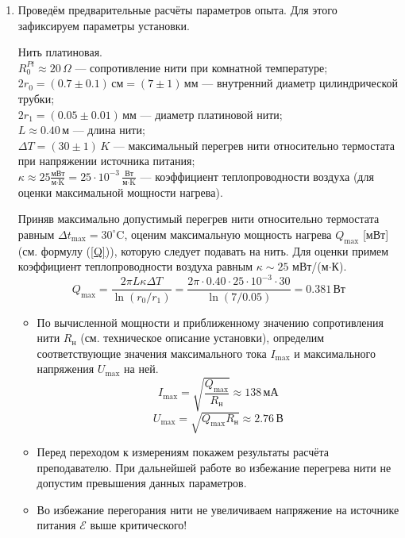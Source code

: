 \documentclass[a4paper,12pt]{article} %
\begin{document}
\begin{enumerate}
    \item Проведём предварительные расчёты параметров опыта. Для этого зафиксируем параметры установки. 
    
    Нить платиновая. \\
    $R^{Pt}_0 \approx 20 \, \Omega$ — сопротивление нити при комнатной температуре; \\
    $2r_0 = (0.7 \pm 0.1) \, \text{см} = (7 \pm 1) \, \text{мм}$ — внутренний диаметр цилиндрической трубки; \\
    $2r_1 = (0.05 \pm 0.01) \, \text{мм}$ — диаметр платиновой нити; \\
    $L \approx 0.40 \, \text{м}$ — длина нити; \\
    $\Delta T = (30 \pm 1) \, K$ — максимальный перегрев нити относительно термостата при напряжении источника питания; \\
    $\kappa \approx 25 \frac{\text{мВт}}{\text{м}\cdot\text{K}} = 25 \cdot 10^{-3} \, \frac{\text{Вт}}{\text{м}\cdot\text{K}}$ — коэффициент теплопроводности воздуха (для оценки максимальной мощности нагрева). 
    
    Приняв максимально допустимый перегрев нити относительно термостата равным $\Delta t_{\text{max}} = 30^\circ$C, оценим максимальную мощность нагрева $Q_{\text{max}}$ [мВт] (см. формулу (\ref{Q})), которую следует подавать на нить. Для оценки примем коэффициент теплопроводности воздуха равным $\kappa \sim 25$ мВт/(м$\cdot$К).
    \[
      Q_{\text{max}} = \frac{2\pi L \kappa \Delta T}{\ln(r_0 / r_1)} = \frac{2 \pi \cdot 0.40 \cdot 25 \cdot 10^{-3} \cdot 30}{\ln(7/0.05)} = 0.381 \, \text{Вт}
    \]
\begin{itemize}
  \item По вычисленной мощности и приближенному значению сопротивления нити $R_\text{н}$ (см. техническое описание установки), определим соответствующие значения максимального тока $I_{\text{max}}$ и максимального напряжения $U_{\text{max}}$ на ней. 
  \[
    I_{\text{max}} = \sqrt{\frac{Q_{\text{max}}}{R_\text{н}}} \approx 138 \, \text{мА}
  \]
  \[
    U_{\text{max}} = \sqrt{Q_{\text{max}} R_\text{н}} \approx 2.76 \, \text{В}
  \]
  \item Перед переходом к измерениям покажем результаты расчёта преподавателю. При дальнейшей работе во избежание перегрева нити не допустим превышения данных параметров.
  \item Во избежание перегорания нити не увеличиваем напряжение на источнике питания $\mathcal{E}$ выше критического!
\end{itemize}


\end{enumerate}
\end{document}
